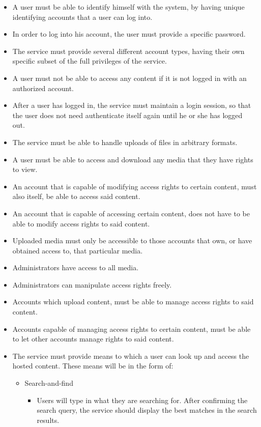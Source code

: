 \documentclass[10pt,a4paper]{article}
\begin{document}
\begin{itemize}
\item A user must be able to identify himself with the system, by having unique identifying accounts that a user can log into.
\item In order to log into his account, the user must provide a specific password.
\item The service must provide several different account types, having their own specific subset of the full privileges of the service.
\item A user must not be able to access any content if it is not logged in with an authorized account.
\item After a user has logged in, the service must maintain a login session, so that the user does not need authenticate itself again until he or she has logged out.
\item The service must be able to handle uploads of files in arbitrary formats.
\item A user must be able to access and download any media that they have rights to view.
\item An account that is capable of modifying access rights to certain content, must also itself, be able to access said content.
\item An account that is capable of accessing certain content, does not have to be able to modify access rights to said content.
\item Uploaded media must only be accessible to those accounts that own, or have obtained access to, that particular media.
\item Administrators have access to all media.
\item Administrators can manipulate access rights freely.
\item Accounts which upload content, must be able to manage access rights to said content.
\item Accounts capable of managing access rights to certain content, must be able to let other accounts manage rights to said content.
\item The service must provide means to which a user can look up and access the hosted content. These means will be in the form of:
\begin{itemize}
\item Search-and-find
\begin{itemize}
\item Users will type in what they are searching for. After confirming the search query, the service should display the best matches in the search results.

\end{itemize}
\end{itemize}
\end{itemize}
\end{document}
